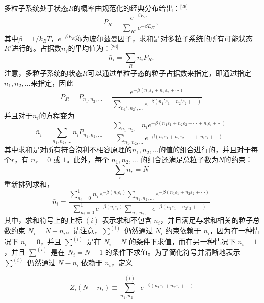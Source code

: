 多粒子系统处于状态\(R\)的概率由规范化的经典分布给出：\(^\text{[26]}\)
\[
P_R = \frac{e^{-\beta E_R}}{\sum_{R'} e^{-\beta E_{R'}}},~
\]
其中\(\beta = 1/k_B T\)，\( e^{-\beta E_R} \)称为玻尔兹曼因子，求和是对多粒子系统的所有可能状态\(R'\)进行的。占据数\(n_i\)的平均值为：\(^\text{[26]}\)
\[
\bar{n}_i = \sum_R n_i P_R.~
\]
注意，多粒子系统的状态\(R\)可以通过单粒子态的粒子占据数来指定，即通过指定\( n_1, n_2, \ldots\)来指定，因此
\[
P_R = P_{n_1, n_2, \ldots} = \frac{e^{-\beta (n_1 \varepsilon_1 + n_2 \varepsilon_2 + \cdots )}}{\sum_{n_1', n_2', \ldots} e^{-\beta (n_1' \varepsilon_1 + n_2' \varepsilon_2 + \cdots )}}~
\]
并且对于\(\bar{n}_i\)的方程变为
\[
\bar{n}_i = \sum_{n_1, n_2, \dots} n_i P_{n_1, n_2, \dots} = \frac{\sum_{n_1, n_2, \dots} n_i e^{-\beta (n_1 \varepsilon_1 + n_2 \varepsilon_2 + \cdots + n_i \varepsilon_i + \cdots )}}{\sum_{n_1, n_2, \dots} e^{-\beta (n_1 \varepsilon_1 + n_2 \varepsilon_2 + \cdots + n_i \varepsilon_i + \cdots )}}~
\]
其中求和是对所有符合泡利不相容原理的\(n_1, n_2, \ldots\)的值的组合进行的，并且对于每个\( r \)，有 \( n_r = 0 \) 或 \( 1 \)。此外，每个 \( n_1, n_2, \ldots \) 的组合还满足总粒子数为\(N\)的约束：
\[
\sum_r n_r = N~
\]
重新排列求和，
\[
\bar{n}_i = \frac{\sum_{n_i=0}^{1} n_i e^{-\beta (n_i \varepsilon_i)} \sum_{n_1, n_2, \dots} e^{-\beta (n_1 \varepsilon_1 + n_2 \varepsilon_2 + \cdots )}}{\sum_{n_i=0}^{1} e^{-\beta (n_i \varepsilon_i)} \sum_{n_1, n_2, \dots} e^{-\beta (n_1 \varepsilon_1 + n_2 \varepsilon_2 + \cdots )}}~
\]
其中，求和符号上的上标 \( (i) \) 表示求和不包含 \( n_i \)，并且满足与求和相关的粒子总数约束 \( N_i = N - n_i \)。请注意，\( \sum^{(i)} \) 仍然通过 \( N_i \) 约束依赖于 \( n_i \)，因为在一种情况下 \( n_i = 0 \)，并且 \( \sum^{(i)} \) 是在 \( N_i = N \) 的条件下求值，而在另一种情况下 \( n_i = 1 \)，并且 \( \sum^{(i)} \) 是在 \( N_i = N - 1 \) 的条件下求值。为了简化符号并清晰地表示 \( \sum^{(i)} \) 仍然通过 \( N - n_i \) 依赖于 \( n_i \)，定义

\[
Z_i(N - n_i) \equiv \sum^{(i)}_{n_1, n_2, \dots} e^{-\beta (n_1 \varepsilon_1 + n_2 \varepsilon_2 + \cdots )}
\]